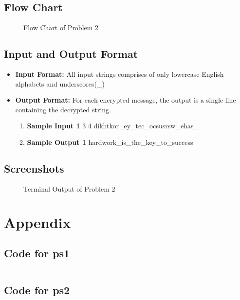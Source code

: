 \documentclass[12pt]{article}
\begin{document}
		\subsection{Flow Chart}
		
			\begin{figure}[h!]
				\centering
				\caption{Flow Chart of Problem 2}
			\end{figure}
		
		
		\subsection{Input and Output Format}
			\begin{itemize}
				\item \textbf{Input Format:} All input strings comprises of only lowercase English alphabets and underscores(\_) 
				\item  \textbf{Output Format:} For each encrypted message, the output is a single line containing the decrypted string.
				\begin{enumerate}
					\item \textbf{Sample Input 1}
					 3 4
					\subitem dikhtkor\_ey\_tec\_ocsusrsw\_ehas\_
					\item \textbf{Sample Output 1}
					\subitem hardwork\_is\_the\_key\_to\_success
					
				\end{enumerate}
			\end{itemize}
			
			
		\subsection{Screenshots}
		
			\begin{figure}[h!]
				\centering
				\caption{Terminal Output of Problem 2}
			\end{figure}
		
	\section{Appendix}
	
	
		\subsection{Code for ps1}
		
			\begin{verbatim}
			\end{verbatim}
			
		
		\subsection{Code for ps2}
		
			
		
		
		
\end{document}
